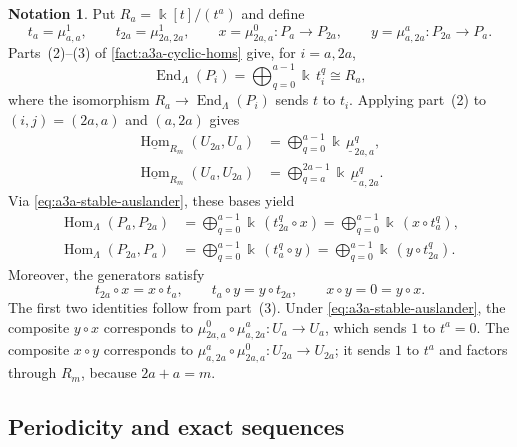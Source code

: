 \documentclass[a4paper,11pt,reqno]{amsart}
\theoremstyle{definition}
\newtheorem{notation}[notation]{Notation}
\theoremstyle{plain}
\numberwithin{equation}{section}
\newcommand{\Hom}{\operatorname{Hom}}
\newcommand{\End}{\operatorname{End}}
\newcommand{\kk}{\Bbbk}
\begin{document}
\begin{notation}
\label{not:a3a-generators}
Put \(R_a=\kk[t]/(t^a)\) and define
\[
 t_a=\mu_{a,a}^1,
 \qquad
 t_{2a}=\mu_{2a,2a}^1,
 \qquad
 x=\mu^0_{2a,a}:P_a\longrightarrow P_{2a},\qquad
 y=\mu^a_{a,2a}:P_{2a}\longrightarrow P_a.
\]
Parts~\textup{(2)}--\textup{(3)} of \cref{fact:a3a-cyclic-homs}
give, for \(i=a,2a\),
\[
 \End_\Lambda(P_i)
 =\bigoplus_{q=0}^{a-1}\kk\,t_i^q
 \cong R_a,
\]
where the isomorphism \(R_a\to\End_\Lambda(P_i)\) sends \(t\) to
\(t_i\).  Applying part~\textup{(2)}
to \((i,j)=(2a,a)\) and \((a,2a)\) gives
\[
\begin{aligned}
\underline{\Hom}_{R_m}(U_{2a},U_a)
 &=\bigoplus_{q=0}^{a-1}\kk\,\underline\mu_{2a,a}^q,\\
\underline{\Hom}_{R_m}(U_a,U_{2a})
 &=\bigoplus_{q=a}^{2a-1}\kk\,\underline\mu_{a,2a}^q.
\end{aligned}
\]
Via \eqref{eq:a3a-stable-auslander}, these bases yield
\begin{equation}
\label{eq:a3a-four-corners}
\begin{aligned}
 \Hom_\Lambda(P_a,P_{2a})
 &=\bigoplus_{q=0}^{a-1}\kk\,(t_{2a}^q\circ x)
  =\bigoplus_{q=0}^{a-1}\kk\,(x\circ t_a^q),\\
 \Hom_\Lambda(P_{2a},P_a)
 &=\bigoplus_{q=0}^{a-1}\kk\,(t_a^q\circ y)
  =\bigoplus_{q=0}^{a-1}\kk\,(y\circ t_{2a}^q).
\end{aligned}
\end{equation}
Moreover, the generators satisfy
\begin{equation}
\label{eq:a3a-corner-relations}
 t_{2a}\circ x=x\circ t_a,
 \qquad
 t_a\circ y=y\circ t_{2a},
 \qquad
 x\circ y=0=y\circ x.
\end{equation}
The first two identities follow from part~\textup{(3)}.  Under
\eqref{eq:a3a-stable-auslander}, the composite
\(y\circ x\) corresponds to
\(\mu_{2a,a}^0\circ\mu_{a,2a}^a:U_a\to U_a\), which sends \(1\) to
\(t^a=0\).  The composite \(x\circ y\) corresponds to
\(\mu_{a,2a}^a\circ\mu_{2a,a}^0:U_{2a}\to U_{2a}\); it sends \(1\) to
\(t^a\) and factors through \(R_m\), because \(2a+a=m\).
\end{notation}

\subsection{Periodicity and exact sequences}
\label{sec:a3a-periodic-detector}
\end{document}
